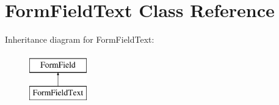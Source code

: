 \hypertarget{class_form_field_text}{}\section{Form\+Field\+Text Class Reference}
\label{class_form_field_text}
Inheritance diagram for Form\+Field\+Text\+:\begin{figure}[H]
\begin{center}
\leavevmode
\includegraphics[height=2.000000cm]{class_form_field_text}
\end{center}
\end{figure}
